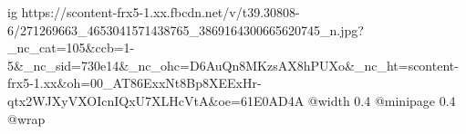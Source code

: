 
 
 
 
 

\ifcmt
  ig https://scontent-frx5-1.xx.fbcdn.net/v/t39.30808-6/271269663_4653041571438765_3869164300665620745_n.jpg?_nc_cat=105&ccb=1-5&_nc_sid=730e14&_nc_ohc=D6AuQn8MKzsAX8hPUXo&_nc_ht=scontent-frx5-1.xx&oh=00_AT86ExxNt8Bp8XEExHr-qtx2WJXyVXOIcnIQxU7XLHcVtA&oe=61E0AD4A
  @width 0.4
  @minipage 0.4
  @wrap \parpic[r]
\fi

